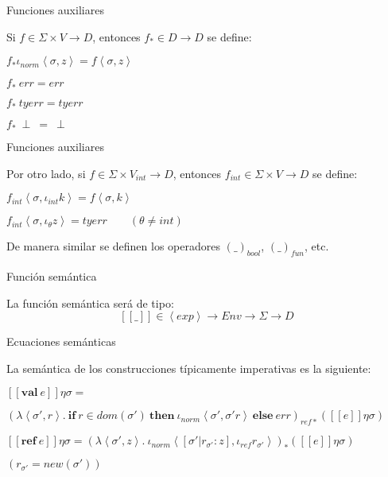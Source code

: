 \documentclass{beamer}
\newcommand{\se}[1]{\mbox{$[\![#1]\!]$}}
\newcommand{\s}{\sigma }
\newcommand{\la}{\left\langle }
\newcommand{\ra}{\right\rangle }
\newcommand{\ife}{\mathbf{if}\ }
\newcommand{\thene}{\ \mathbf{then}\ }
\newcommand{\elsee}{\ \mathbf{else}\ }
\newcommand{\ex}{\left\langle exp\right\rangle}
\begin{document}
\begin{frame}{Funciones auxiliares}

\bigskip

Si $f \in \Sigma\times V\rightarrow D$, entonces $f_* \in D \rightarrow D$ se define:

\medskip$f_* \iota_{norm}\la \s,z\ra = f \la\s,z\ra$

\smallskip$f_*\ err =  err$

\smallskip$f_*\ tyerr =  tyerr$


\smallskip$f_*\ \perp \ = \ \perp$

\end{frame}



\begin{frame}{Funciones auxiliares}


\medskip\noindent Por otro lado, si $f \in \Sigma\times V_{int}\rightarrow D$, entonces $f_{int} \in \Sigma\times V \rightarrow D$ se define:

\bigskip

\medskip$f_{int} \la \s,\iota_{int} k\ra = f \la\s,k\ra$

\smallskip$f_{int} \la \s,\iota_{\theta} z\ra = tyerr \qquad(\theta\neq int)$

\medskip

\bigskip

\noindent De manera similar se definen los operadores $(\_)_{\mathit{bool}}$, $(\_)_{\mathit{fun}}$, etc.


\end{frame}


\begin{frame}{Función semántica}

La función semántica será de tipo:
\[
\se{\_}\in \ex\rightarrow Env\rightarrow\Sigma\rightarrow D
\]

\end{frame}


\begin{frame}{Ecuaciones semánticas}

La semántica de los construcciones típicamente imperativas es la siguiente:

\bigskip

$\se{\textbf{val}\ e}\eta\s = $

\bigskip

$(\lambda \la\s',r\ra.\ \ife r\in dom(\s') \thene \iota_{norm}\la\s',\s' r\ra \elsee err)_{ref*} (\se{e}\eta\s)$
\pause
\bigskip

$\se{\textbf{ref}\ e}\eta\s = (\lambda \la\s',z\ra.\ \iota_{norm}\la[\s'|r_{\s'}:z],\iota_{ref}r_{\s'}\ra)_* (\se{e}\eta\s)$

\bigskip 

\qquad\qquad\qquad\qquad\qquad\qquad\qquad\qquad$(r_{\s'} = new(\s'))$


\end{frame}
\end{document}
